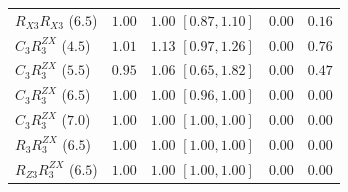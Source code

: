 \documentclass[aps,prx,reprint,superscriptaddress,nofootinbib,floatfix]{revtex4-2}
\begin{document}
\begin{table}[!htbp]
{\begin{ruledtabular}
\begin{tabular}{lcccc}
$R_{X3} R_{X3}$ ($6.5$) & $1.00$ & $1.00$ $[0.87, 1.10]$ & $0.00$ & $0.16$ \\
$C_3 R_3^{ZX}$ ($4.5$) & $1.01$ & $1.13$ $[0.97, 1.26]$ & $0.00$ & $0.76$ \\
$C_3 R_3^{ZX}$ ($5.5$) & $0.95$ & $1.06$ $[0.65, 1.82]$ & $0.00$ & $0.47$ \\
$C_3 R_3^{ZX}$ ($6.5$) & $1.00$ & $1.00$ $[0.96, 1.00]$ & $0.00$ & $0.00$ \\
$C_3 R_3^{ZX}$ ($7.0$) & $1.00$ & $1.00$ $[1.00, 1.00]$ & $0.00$ & $0.00$ \\
$R_3 R_3^{ZX}$ ($6.5$) & $1.00$ & $1.00$ $[1.00, 1.00]$ & $0.00$ & $0.00$ \\
$R_{Z3} R_3^{ZX}$ ($6.5$) & $1.00$ & $1.00$ $[1.00, 1.00]$ & $0.00$ & $0.00$ \\
\end{tabular}
\end{ruledtabular}
}
\end{table}



\end{document}
